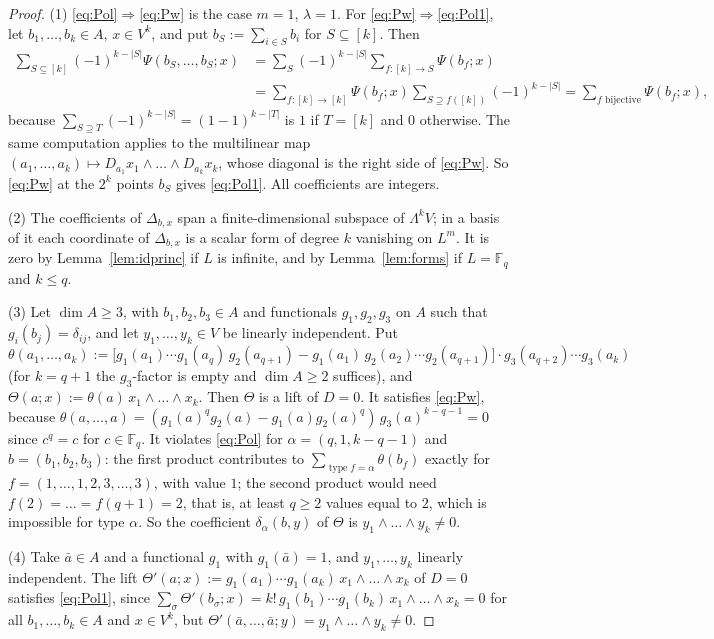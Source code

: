 \documentclass[11pt]{amsart}
\theoremstyle{definition}
\theoremstyle{remark}
\numberwithin{equation}{section}
\newcommand{\F}{\mathbb{F}}
\newcommand{\type}{\operatorname{type}}
\newcommand{\abs}[1]{\lvert #1\rvert}
\begin{document}
\begin{proof}
(1) \eqref{eq:Pol}$\Rightarrow$\eqref{eq:Pw} is the case $m=1$, $\lambda=1$. For \eqref{eq:Pw}$\Rightarrow$\eqref{eq:Pol1}, let $b_1,\dots,b_k\in A$,
$x\in V^k$, and put $b_S:=\sum_{i\in S}b_i$ for $S\subseteq[k]$. Then
\begin{align*}
\sum_{S\subseteq[k]}(-1)^{k-\abs S}\Psi(b_S,\dots,b_S;x)&=\sum_S(-1)^{k-\abs S}\sum_{f\colon[k]\to S}\Psi(b_f;x)\\
&=\sum_{f\colon[k]\to[k]}\Psi(b_f;x)\sum_{S\supseteq f([k])}(-1)^{k-\abs S}=\sum_{f\text{ bijective}}\Psi(b_f;x),
\end{align*}
because $\sum_{S\supseteq T}(-1)^{k-\abs S}=(1-1)^{k-\abs T}$ is $1$ if $T=[k]$ and $0$ otherwise. The same computation
applies to the multilinear map $(a_1,\dots,a_k)\mapsto D_{a_1}x_1\wedge\dots\wedge D_{a_k}x_k$, whose diagonal is the right
side of \eqref{eq:Pw}. So \eqref{eq:Pw} at the $2^k$ points $b_S$ gives \eqref{eq:Pol1}. All coefficients are integers.

(2) The coefficients of $\Delta_{b,x}$ span a finite-dimensional subspace of $\Lambda^kV$; in a basis of it each
coordinate of $\Delta_{b,x}$ is a scalar form of degree $k$ vanishing on $L^m$. It is zero by Lemma~\ref{lem:idprinc}
if $L$ is infinite, and by Lemma~\ref{lem:forms} if $L=\F_q$ and $k\le q$.

(3) Let $\dim A\ge3$, with $b_1,b_2,b_3\in A$ and functionals $g_1,g_2,g_3$ on $A$ such that
$g_i(b_j)=\delta_{ij}$, and let $y_1,\dots,y_k\in V$ be linearly independent. Put
\[
\theta(a_1,\dots,a_k):=\bigl[g_1(a_1)\cdots g_1(a_q)\,g_2(a_{q+1})-g_1(a_1)\,g_2(a_2)\cdots g_2(a_{q+1})\bigr]
\cdot g_3(a_{q+2})\cdots g_3(a_k)
\]
(for $k=q+1$ the $g_3$\nobreakdash-factor is empty and $\dim A\ge2$ suffices), and $\Theta(a;x):=\theta(a)\,x_1\wedge\dots\wedge x_k$.
Then $\Theta$ is a lift of $D=0$. It satisfies \eqref{eq:Pw}, because
$\theta(a,\dots,a)=(g_1(a)^qg_2(a)-g_1(a)g_2(a)^q)\,g_3(a)^{k-q-1}=0$ since $c^q=c$ for $c\in\F_q$. It
violates \eqref{eq:Pol} for $\alpha=(q,1,k-q-1)$ and $b=(b_1,b_2,b_3)$: the first product contributes to
$\sum_{\type f=\alpha}\theta(b_f)$ exactly for $f=(1,\dots,1,2,3,\dots,3)$, with value $1$; the second product would need
$f(2)=\dots=f(q+1)=2$, that is, at least $q\ge2$ values equal to $2$, which is impossible for type $\alpha$. So the
coefficient $\delta_\alpha(b,y)$ of $\Theta$ is $y_1\wedge\dots\wedge y_k\neq0$.

(4) Take $\bar a\in A$ and a functional $g_1$ with $g_1(\bar a)=1$, and $y_1,\dots,y_k$ linearly independent. The
lift $\Theta'(a;x):=g_1(a_1)\cdots g_1(a_k)\,x_1\wedge\dots\wedge x_k$ of $D=0$ satisfies \eqref{eq:Pol1}, since
$\sum_\sigma\Theta'(b_\sigma;x)=k!\,g_1(b_1)\cdots g_1(b_k)\,x_1\wedge\dots\wedge x_k=0$ for all
$b_1,\dots,b_k\in A$ and $x\in V^k$, but $\Theta'(\bar a,\dots,\bar a;y)=y_1\wedge\dots\wedge y_k\neq0$.
\end{proof}
\end{document}
